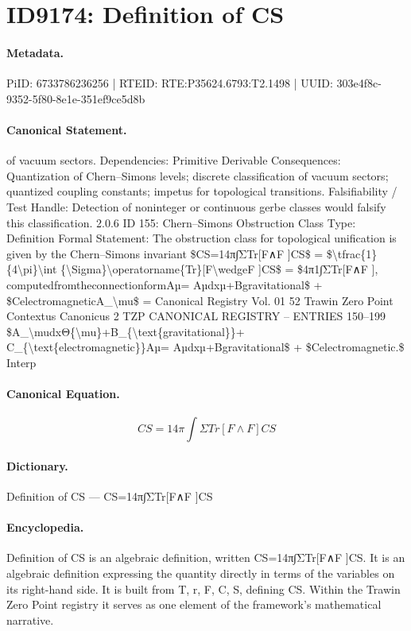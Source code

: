 \section*{ID9174: Definition of CS}
\paragraph{Metadata.}
PiID: 6733786236256 | RTEID: RTE:P35624.6793:T2.1498 | UUID: 303e4f8c-9352-5f80-8e1e-351ef9ce5d8b

\paragraph{Canonical Statement.}
of vacuum sectors. Dependencies: Primitive Derivable Consequences: Quantization of Chern–Simons levels; discrete classification of vacuum sectors; quantized coupling constants; impetus for topological transitions. Falsifiability / Test Handle: Detection of noninteger or continuous gerbe classes would falsify this classification. 2.0.6 ID 155: Chern–Simons Obstruction Class Type: Definition Formal Statement: The obstruction class for topological unification is given by the Chern–Simons invariant \$CS=14π∫ΣTr[F∧F ]CS\$ = \$\textbackslash{}tfrac\{1\}\{4\textbackslash{}pi\}\textbackslash{}int \{\textbackslash{}Sigma\}\textbackslash{}operatorname\{Tr\}[F\textbackslash{}wedgeF ]CS\$ = \$4π1∫ΣTr[F∧F ], computedfromtheconnectionformAµ= Aµdxµ+Bgravitational\$ + \$CelectromagneticA\_\textbackslash{}mu\$ = Canonical Registry Vol. 01 52 Trawin Zero Point Contextus Canonicus 2 TZP CANONICAL REGISTRY – ENTRIES 150–199 \$A\_\textbackslash{}mudxΘ\{\textbackslash{}mu\}+B\_\{\textbackslash{}text\{gravitational\}\}+ C\_\{\textbackslash{}text\{electromagnetic\}\}Aµ= Aµdxµ+Bgravitational\$ + \$Celectromagnetic.\$ Interp

\paragraph{Canonical Equation.}
\[
CS=14π∫ΣTr[F∧F ]CS
\]

\paragraph{Dictionary.}
Definition of CS — CS=14π∫ΣTr[F∧F ]CS

\paragraph{Encyclopedia.}
Definition of CS is an algebraic definition, written CS=14π∫ΣTr[F∧F ]CS. It is an algebraic definition expressing the quantity directly in terms of the variables on its right-hand side. It is built from T, r, F, C, S, defining CS. Within the Trawin Zero Point registry it serves as one element of the framework's mathematical narrative.
